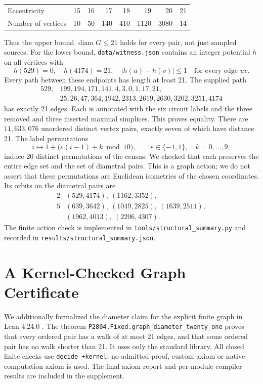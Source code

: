 \documentclass[11pt]{article}
\newcommand{\diam}{\operatorname{diam}}
\begin{document}
\begin{center}
\begin{tabular}{lrrrrrrr}
\toprule
Eccentricity &15&16&17&18&19&20&21\\
Number of vertices &10&50&140&410&1120&3080&14\\
\bottomrule
\end{tabular}
\end{center}
Thus the upper bound $\diam G\leq21$ holds for every pair, not just sampled
sources. For the lower bound, \texttt{data/witness.json} contains an integer
potential $h$ on all vertices with
\[
h(529)=0,\quad h(4174)=21,\quad |h(u)-h(v)|\leq1\quad\text{for every edge }uv.
\]
Every path between these endpoints has length at least 21. The supplied path
\[
\begin{split}
529,&199,194,171,141,4,3,0,1,17,21,\\
&25,26,47,364,1942,2313,2619,2630,3202,3251,4174
\end{split}
\]
has exactly 21 edges. Each is annotated with the six circuit labels and the
three removed and three inserted maximal simplices. This proves equality.
There are $11,633,076$ unordered distinct vertex pairs, exactly seven of which
have distance 21. The label permutations
\[
 i\longmapsto 1+\bigl(\varepsilon(i-1)+k\bmod10\bigr),
 \qquad \varepsilon\in\{-1,1\},\quad k=0,\ldots,9,
\]
induce 20 distinct permutations of the census. We checked that each preserves
the entire edge set and the set of diametral pairs. This is a graph action;
we do not assert that these permutations are Euclidean isometries of the
chosen coordinates. Its orbits on the diametral pairs are
\[
\begin{array}{cl}
2 & (529,4174),\ (1162,3352),\\
5 & (639,3642),\ (1049,2825),\ (1639,2511),\\
  & (1962,4013),\ (2206,4307).
\end{array}
\]
The finite action check is implemented in
\texttt{tools/structural\_summary.py} and recorded in
\texttt{results/structural\_summary.json}.

\section{A Kernel-Checked Graph Certificate}
We additionally formalized the diameter claim for the explicit finite graph
in Lean 4.24.0 \cite{lean4}. The theorem
\texttt{P2804.Fixed.graph\_diameter\_twenty\_one}
proves that every ordered pair has a walk of at most 21 edges, and that some
ordered pair has no walk shorter than 21. It uses only the standard library.
All closed finite checks use \texttt{decide +kernel}; no admitted proof,
custom axiom or native-computation axiom is used. The final axiom report and
per-module compiler results are included in the supplement.
\end{document}
